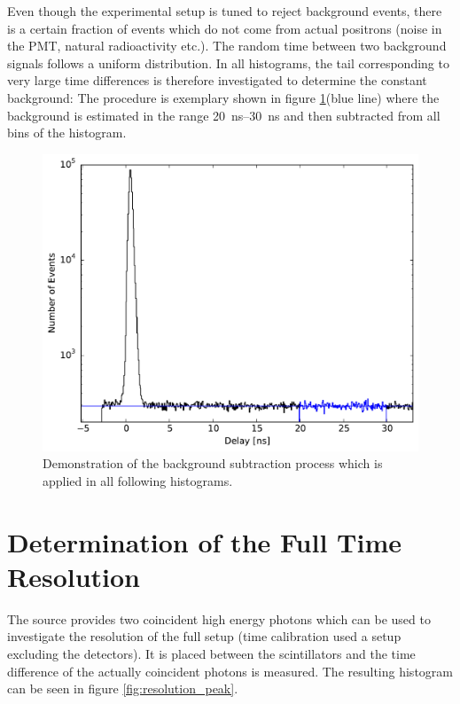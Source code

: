 \documentclass[
	paper=A4,
	parskip=full,
	chapterprefix=true,
	11pt,
	headings=normal,
	bibliography=totoc,
	listof=totoc,
	titlepage=on,
]{scrreprt}
\begin{document}
Even though the experimental setup is tuned to reject background events, there is a certain fraction of events which do not come from actual positrons (noise in the PMT, natural radioactivity etc.). The random time between two background signals follows a uniform distribution. In all histograms, the tail corresponding to very large time differences is therefore investigated to determine the constant background: The procedure is exemplary shown in figure \ref{fig:resolution_background}(blue line) where the background is estimated in the range \SIrange{20}{30}{\nano\second} and then subtracted from all bins of the histogram. 

\begin{figure}
	\centering
	\includegraphics{resolution_background}
	\caption{Demonstration of the background subtraction process which is applied in all following histograms.}
	\label{fig:resolution_background}
\end{figure}

\section{Determination of the Full Time Resolution}
The  source provides two coincident high energy photons which can be used to investigate the resolution of the full setup (time calibration used a setup excluding the detectors). It is placed between the scintillators and the time difference of the actually coincident photons is measured. The resulting histogram can be seen in figure \ref{fig:resolution_peak}. 
\end{document}

